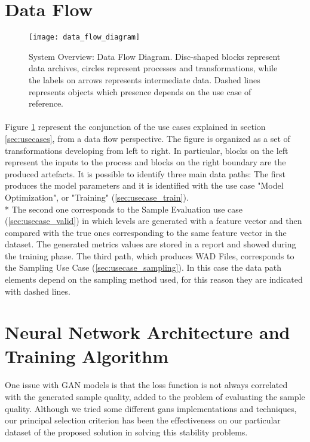 \section{Data Flow}
\label{sec:dataflow}
\begin{figure}[h!]
	\begin{center}
		\texttt{[image: data\_flow\_diagram]}
	\end{center}
	
	\captionsetup{width=\linewidth}
	\caption[System Overview: Data Flow Diagram]{System Overview: Data Flow Diagram. Disc-shaped blocks represent data archives, circles represent processes and transformations, while the labels on arrows represents intermediate data. Dashed lines represents objects which presence depends on the use case of reference.}
	\label{fig:dataflow}
\end{figure}

\paragraph{} Figure \ref{fig:dataflow} represent the conjunction of the use cases explained in section \ref{sec:usecases}, from a data flow perspective.  The figure is organized as a set of transformations developing from left to right. In particular, blocks on the left represent the inputs to the process and blocks on the right boundary are the produced artefacts. 
It is possible to identify three main data paths: The first produces the model parameters and it is identified with the use case "Model Optimization", or "Training" (\ref{sec:usecase_train}). \\* The second one corresponds to the Sample Evaluation use case (\ref{sec:usecase_valid}) in which levels are generated with a feature vector and then compared with the true ones corresponding to the same feature vector in the dataset. The generated metrics values are stored in a report and showed during the training phase.
The third path, which produces WAD Files, corresponds to the Sampling Use Case (\ref{sec:usecase_sampling}). In this case the data path elements depend on the sampling method used, for this reason they are indicated with dashed lines.

\newpage

\section{Neural Network Architecture and Training Algorithm}
\label{sec:nn}
\paragraph{} One issue with GAN models is that the loss function is not always correlated with the generated sample quality, added to the problem of evaluating the sample quality. Although we tried some different \glspl{gan} implementations and techniques, our principal selection criterion has been the effectiveness on our particular dataset of the proposed solution in solving this stability problems.

